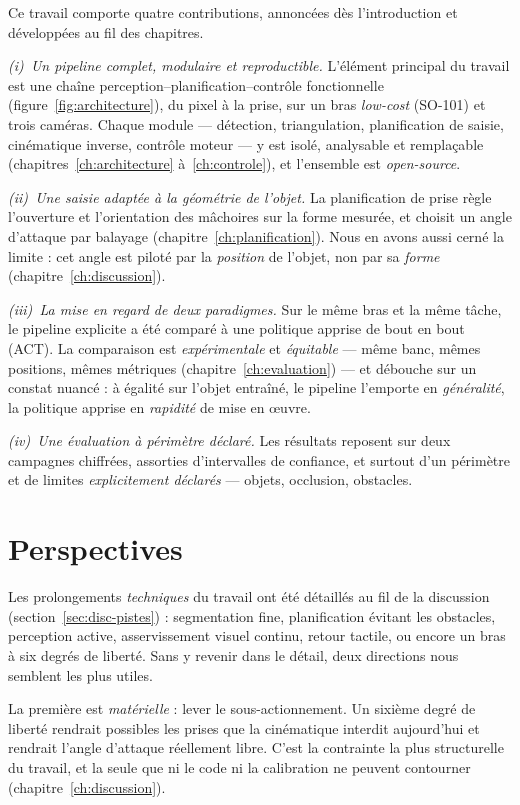 Ce travail comporte quatre contributions, annoncées dès l'introduction et développées au fil des chapitres.

\emph{(i)~Un pipeline complet, modulaire et reproductible.} L'élément principal du travail est une chaîne perception--planification--contrôle fonctionnelle (figure~\ref{fig:architecture}), du pixel à la prise, sur un bras \emph{low-cost} (SO-101) et trois caméras. Chaque module --- détection, triangulation, planification de saisie, cinématique inverse, contrôle moteur --- y est isolé, analysable et remplaçable (chapitres~\ref{ch:architecture} à~\ref{ch:controle}), et l'ensemble est \emph{open-source}.

\emph{(ii)~Une saisie adaptée à la géométrie de l'objet.} La planification de prise règle l'ouverture et l'orientation des mâchoires sur la forme mesurée, et choisit un angle d'attaque par balayage (chapitre~\ref{ch:planification}). Nous en avons aussi cerné la limite : cet angle est piloté par la \emph{position} de l'objet, non par sa \emph{forme} (chapitre~\ref{ch:discussion}).

\emph{(iii)~La mise en regard de deux paradigmes.} Sur le même bras et la même tâche, le pipeline explicite a été comparé à une politique apprise de bout en bout (ACT). La comparaison est \emph{expérimentale} et \emph{équitable} --- même banc, mêmes positions, mêmes métriques (chapitre~\ref{ch:evaluation}) --- et débouche sur un constat nuancé : à égalité sur l'objet entraîné, le pipeline l'emporte en \emph{généralité}, la politique apprise en \emph{rapidité} de mise en {\oe}uvre.

\emph{(iv)~Une évaluation à périmètre déclaré.} Les résultats reposent sur deux campagnes chiffrées, assorties d'intervalles de confiance, et surtout d'un périmètre et de limites \emph{explicitement déclarés} --- objets, occlusion, obstacles.

\section{Perspectives}
\label{sec:concl-perspectives}

Les prolongements \emph{techniques} du travail ont été détaillés au fil de la discussion (section~\ref{sec:disc-pistes}) : segmentation fine, planification évitant les obstacles, perception active, asservissement visuel continu, retour tactile, ou encore un bras à six degrés de liberté. Sans y revenir dans le détail, deux directions nous semblent les plus utiles.

La première est \emph{matérielle} : lever le sous-actionnement. Un sixième degré de liberté rendrait possibles les prises que la cinématique interdit aujourd'hui et rendrait l'angle d'attaque réellement libre. C'est la contrainte la plus structurelle du travail, et la seule que ni le code ni la calibration ne peuvent contourner (chapitre~\ref{ch:discussion}).

